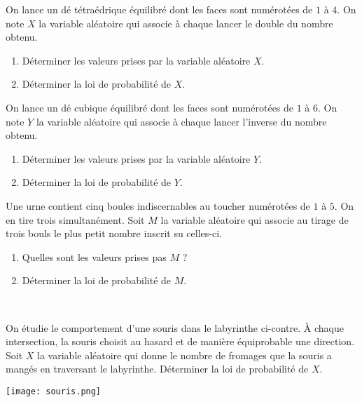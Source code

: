\documentclass[11pt]{article}
\begin{document}
\thispagestyle{empty}

\begin{exo}
  On lance un dé tétraédrique équilibré dont les faces sont numérotées de $1$ à
  $4$. On note $X$ la variable aléatoire qui associe à chaque lancer le double
  du nombre obtenu.
  \begin{enumerate}
    \item Déterminer les valeurs prises par la variable aléatoire $X$.
    \item Déterminer la loi de probabilité de $X$.
  \end{enumerate}
\end{exo}

\begin{exo}
  On lance un dé cubique équilibré dont les faces sont numérotées de $1$ à
  $6$. On note $Y$ la variable aléatoire qui associe à chaque lancer l'inverse
  du nombre obtenu.
  \begin{enumerate}
    \item Déterminer les valeurs prises par la variable aléatoire $Y$.
    \item Déterminer la loi de probabilité de $Y$.
  \end{enumerate}
\end{exo}

\begin{exo}
  Une urne contient cinq boules indiscernables au toucher numérotées de $1$ à
  $5$. On en tire trois simultanément. Soit $M$ la variable aléatoire qui
  associe au tirage de trois bouls le plus petit nombre inscrit su celles-ci.
  \begin{enumerate}
    \item Quelles sont les valeurs prises pas $M$ ?
    \item Déterminer la loi de probabilité de $M$.
  \end{enumerate}
\end{exo}

\begin{exo}~\\
  \begin{minipage}[]{.5\textwidth}
    On étudie le comportement d'une souris dans le labyrinthe ci-contre. À
    chaque intersection, la souris choisit au hasard et de manière équiprobable
    une direction. Soit $X$ la variable aléatoire qui donne le nombre de
    fromages que la souris a mangés en traversant le labyrinthe. Déterminer la
    loi de probabilité de $X$.
  \end{minipage}
  \begin{minipage}[]{.5\textwidth}
    \begin{center}
      \texttt{[image: souris.png]}
    \end{center}
  \end{minipage}
\end{exo}
\end{document}
